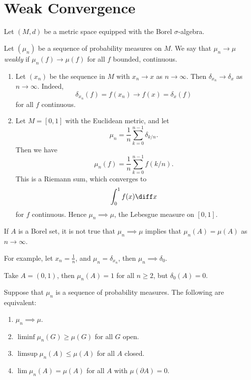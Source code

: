 \documentclass[12pt]{article}
\begin{document}
\newpage

\section{Weak Convergence}%
\label{sec:wc}

Let $(M, d)$ be a metric space equipped with the Borel $\sigma$-algebra.

\begin{definition}
	Let $(\mu_n)$ be a sequence of probability measures on $M$. We say that $\mu_n \to \mu$ \emph{weakly} if $\mu_n(f) \to \mu(f)$ for all $f$ bounded, continuous.
\end{definition}

\begin{exbox}
	\begin{enumerate}
		\item Let $(x_n)$ be the sequence in $M$ with $x_n \to x$ as $n \to \infty$. Then $\delta_{x_n} \to \delta_x$ as $n \to \infty$. Indeed,
			\[
			\delta_{x_n}(f) = f(x_n) \to f(x) = \delta_x(f)
			\]
			 for all $f$ continuous.
		 \item Let $M = [0, 1]$ with the Euclidean metric, and let
			 \[
			 \mu_n = \frac{1}{n} \sum_{k = 0}^{n-1} \delta_{k/n}.
			 \]
			 Then we have
			 \[
			 \mu_n(f) = \frac{1}{n} \sum_{k = 0}^{n-1} f(k/n).
			 \]
			 This is a Riemann sum, which converges to
			 \[
			 \int_0^1 f(x) \diff x
			 \]
			 for $f$ continuous. Hence $\mu_n \implies \mu$, the Lebesgue measure on $[0, 1]$.
	\end{enumerate}
\end{exbox}

\begin{remark}
	If $A$ is a Borel set, it is not true that $\mu_n \implies \mu$ implies that $\mu_n(A) = \mu(A)$ as $n \to \infty$.

	For example, let $x_n = \frac{1}{n}$, and $\mu_n = \delta_{x_n}$, then $\mu_n \implies \delta_0.$ 

	Take $A = (0, 1)$, then $\mu_n(A) = 1$ for all $n \geq 2$, but $\delta_0(A) = 0$.
\end{remark}

\begin{theorem}
	Suppose that $\mu_n$ is a sequence of probability measures. The following are equivalent:
	\begin{enumerate}[\normalfont(i)]
		\item $\mu_n \implies \mu$.
		\item $\liminf \mu_n(G) \geq \mu(G)$ for all $G$ open.
		\item $\limsup \mu_n(A) \leq \mu(A)$ for all $A$ closed.
		\item $\lim \mu_n(A) = \mu(A)$ for all $A$ with $\mu(\partial A) = 0$.
	\end{enumerate}
\end{theorem}
\end{document}
